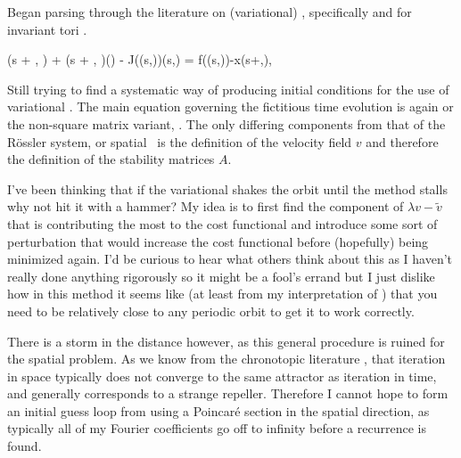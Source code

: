 

Began parsing through the literature on (variational) {\descent},
specifically  and for invariant tori
.


\beq
\frac{\partial \conf}{\partial \tau}(s + \omega, \tau) + (s + \omega, \tau)\frac{\partial \omega}{\partial \tau}(\tau) - J(\conf(s,\tau))\frac{\partial \conf}{\partial \tau}(s,\tau) =
f(\conf (s,\tau))-x(s+\omega,\tau),


Still trying to find a systematic way of producing initial conditions for
the use of variational {\descent}. The main equation governing the
fictitious time evolution is again  or the non-square
matrix variant, . The only differing components
from that of the R\"ossler system, or spatial \KS\ is the definition of
the velocity field $v$ and therefore the definition of the stability
matrices $A$.


I've been thinking that if the variational {\descent} shakes the orbit until
the method stalls why not hit it with a hammer? My idea is to first find the
component of $\lambda v - \tilde{v}$ that is contributing the most to the cost
functional and introduce some sort of perturbation that would increase the cost
functional before (hopefully) being minimized again. I'd be curious to hear
what others think about this as I haven't really done anything rigorously so it
might be a fool's errand but I just dislike how in this method it seems like
(at least from my interpretation of ) that you need to be relatively
close to any periodic orbit to get it to work correctly.


There is a storm in the distance however, as this general procedure is ruined for the spatial problem. As we know from the chronotopic literature , that iteration in space typically does not converge to the same attractor as iteration in time, and generally corresponds to a strange repeller. Therefore I cannot hope to form an initial guess loop from using a Poincar\'e section in the spatial direction, as typically all of my Fourier coefficients go off to infinity before a recurrence is found.

